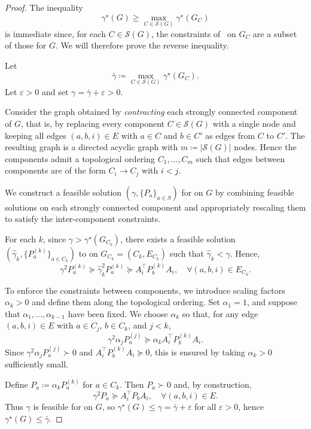 \documentclass[letterpaper, 10 pt, conference]{ieeeconf}  %
\begin{document}
\begin{proof}
The inequality
\[
\gamma^\star (G)
\ge
\max_{C\in\mathcal S(G)} \gamma^\star (G_C)
\]
is immediate since, for each $C\in\mathcal S(G)$, the constraints of~ on $G_C$ are a subset of those for $G$. We will therefore prove the reverse inequality.

Let
\[
\bar\gamma \coloneqq
\max_{C\in\mathcal S(G)} \gamma^\star (G_C).
\]
Let $\varepsilon > 0$ and set $\gamma = \bar\gamma + \varepsilon >0$.

Consider the graph obtained by \emph{contracting} each strongly connected
component of $G$, that is, by replacing every component $C\in\mathcal S(G)$
with a single node and keeping all edges $(a,b,i)\in E$ with $a\in C$ and
$b\in C'$ as edges from $C$ to $C'$.
The resulting graph is a directed acyclic graph with $m\coloneqq |\mathcal S(G)|$ nodes.
Hence the components admit a topological ordering
$C_1,\dots,C_m$ such that edges between components are of the form
$C_i \to C_j$ with $i<j$.

We construct a feasible solution $(\gamma, \{P_a\}_{a\in S})$ for  on $G$ by combining feasible solutions on each
strongly connected component and appropriately rescaling them to satisfy
the inter-component constraints.

For each $k$, since $\gamma>\gamma^\star(G_{C_k})$, there exists a feasible solution
$(\hat\gamma_k,\{P_a^{(k)}\}_{a\in C_k})$ to
 on $G_{C_k}=(C_k,E_{C_k})$ such that
$\hat\gamma_k<\gamma$. Hence,
\[
\gamma^2 P_a^{(k)} \succeq
\hat\gamma_k^2 P_a^{(k)}
\succeq A_i^\top P_b^{(k)} A_i,
\quad \forall (a,b,i)\in E_{C_k}.
\]

To enforce the constraints between components, we introduce scaling
factors $\alpha_k>0$ and define them along the topological ordering.
Set $\alpha_1=1$, and suppose that $\alpha_1,\dots,\alpha_{k-1}$ have
been fixed. We choose $\alpha_k$ so that, for any edge $(a,b,i)\in E$
with $a\in C_j$, $b\in C_k$, and $j<k$,
\[
\gamma^2 \alpha_j P_a^{(j)}
\succeq
\alpha_k A_i^\top P_b^{(k)} A_i.
\]
Since $\gamma^2 \alpha_j P_a^{(j)} \succ 0$ and
$A_i^\top P_b^{(k)} A_i \succeq 0$, this is ensured by taking
$\alpha_k>0$ sufficiently small.

Define $P_a \coloneqq \alpha_k P_a^{(k)}$ for $a\in C_k$. Then $P_a\succ0$
and, by construction,
\[
\gamma^2 P_a \succeq A_i^\top P_b A_i, \quad \forall (a,b,i)\in E.
\]
Thus $\gamma$ is feasible for  on $G$, so
$\gamma^\star(G) \le \gamma = \bar\gamma + \varepsilon$ for all
$\varepsilon>0$, hence $\gamma^\star(G) \le \bar\gamma$.
\end{proof}
\fi
\end{document}
